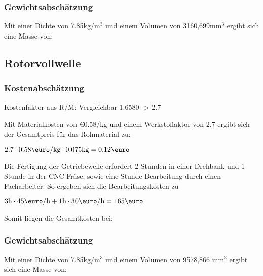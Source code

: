\documentclass[10pt, a4paper]{article}
\begin{document}
\subsubsection{Gewichtsabschätzung}
Mit einer Dichte von 7.85kg/m$^3$ und einem Volumen von 3160,699mm$^3$ ergibt sich eine Masse von:
\begin{flushright}
\end{flushright}

\newpage
\subsection{Rotorvollwelle}
\begin{figure}[h]
  \centering
  \vspace{-10pt}
\end{figure}
\subsubsection{Kostenabschätzung}
\begin{center}
  Kostenfaktor aus R/M: Vergleichbar 1.6580 -> 2.7 \\
\end{center}
Mit Materialkosten von \euro0.58/kg und einem Werkstoffaktor von 2.7 ergibt sich der Gesamtpreis für das Rohmaterial zu: 
\begin{center}
    $2.7 \cdot 0.58\text{\euro/kg} \cdot 0.075\text{kg} = 0.12\text{\euro}$
\end{center}
Die Fertigung der Getriebewelle erfordert 2 Stunden in einer Drehbank und 1 Stunde in der CNC-Fräse, sowie eine Stunde Bearbeitung durch einen Facharbeiter. So ergeben sich die Bearbeitungskosten zu 
\begin{center}
  $3\text{h} \cdot 45\text{\euro/h} + 1\text{h} \cdot 30\text{\euro/h}= 165\text{\euro}$
\end{center}
Somit liegen die Gesamtkosten bei:
\begin{flushright}
\end{flushright}
\subsubsection{Gewichtsabschätzung}
Mit einer Dichte von 7.85kg/m$^3$ und einem Volumen von 9578,866 mm$^3$ ergibt sich eine Masse von:
\begin{flushright}
\end{flushright}
\end{document}
